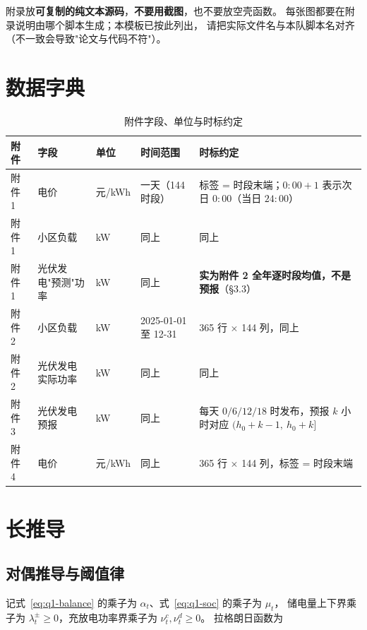 \begin{guideblock}
附录放\textbf{可复制的纯文本源码}，\textbf{不要用截图}，也不要放空壳函数。
每张图都要在附录说明由哪个脚本生成；本模板已按此列出，
请把实际文件名与本队脚本名对齐（不一致会导致"论文与代码不符"）。
\end{guideblock}

\section{数据字典}

\begin{table}[htbp]
  \centering
  \caption{附件字段、单位与时标约定}
  \label{tab:datadict}
  \footnotesize
  \begin{tabularx}{\linewidth}{C{1.4cm} L{3.0cm} C{1.6cm} C{2.4cm} Y}
    \toprule
    附件 & 字段 & 单位 & 时间范围 & 时标约定 \\
    \midrule
    附件 1 & 电价 & 元/kWh & 一天（144 时段） & 标签 = 时段末端；\(0{:}00{+}1\) 表示次日 \(0{:}00\)（当日 \(24{:}00\)） \\
    附件 1 & 小区负载 & kW & 同上 & 同上 \\
    附件 1 & 光伏发电"预测"功率 & kW & 同上 & \textbf{实为附件 2 全年逐时段均值，不是预报}（§3.3） \\
    附件 2 & 小区负载 & kW & 2025-01-01 至 12-31 & 365 行 \(\times\) 144 列，同上 \\
    附件 2 & 光伏发电实际功率 & kW & 同上 & 同上 \\
    附件 3 & 光伏发电预报 & kW & 同上 & 每天 \(0/6/12/18\) 时发布，预报 \(k\) 小时对应 \((h_0+k-1,\ h_0+k]\) \\
    附件 4 & 电价 & 元/kWh & 同上 & 365 行 \(\times\) 144 列，标签 = 时段末端 \\
    \bottomrule
  \end{tabularx}
\end{table}

\section{长推导}

\subsection{对偶推导与阈值律}

记式~\eqref{eq:q1-balance} 的乘子为 \(\alpha_t\)、式~\eqref{eq:q1-soc} 的乘子为 \(\mu_t\)，
储电量上下界乘子为 \(\lambda^{\pm}_t\ge 0\)，充放电功率界乘子为 \(\nu^{c}_t,\nu^{d}_t\ge 0\)。
拉格朗日函数为

